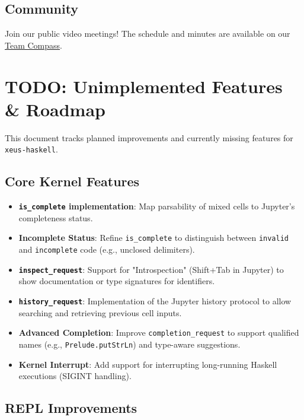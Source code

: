 \documentclass[11pt]{article}
\begin{document}
\subsection{Community}


Join our public video meetings! The schedule and minutes are available on our \href{https://jupyter-xeus.github.io/}{Team Compass}.

\section{TODO: Unimplemented Features \& Roadmap}
\label{sec:todo}


This document tracks planned improvements and currently missing features for \texttt{xeus-haskell}.
\subsection{Core Kernel Features}


\begin{itemize}
\item [x] \textbf{\texttt{is\_complete} implementation}: Map parsability of mixed cells to Jupyter's completeness status.
\item [ ] \textbf{Incomplete Status}: Refine \texttt{is\_complete} to distinguish between \texttt{invalid} and \texttt{incomplete} code (e.g., unclosed delimiters).
\item [x] \textbf{\texttt{inspect\_request}}: Support for "Introspection" (Shift+Tab in Jupyter) to show documentation or type signatures for identifiers.
\item [ ] \textbf{\texttt{history\_request}}: Implementation of the Jupyter history protocol to allow searching and retrieving previous cell inputs.
\item [ ] \textbf{Advanced Completion}: Improve \texttt{completion\_request} to support qualified names (e.g., \texttt{Prelude.putStrLn}) and type-aware suggestions.
\item [ ] \textbf{Kernel Interrupt}: Add support for interrupting long-running Haskell executions (SIGINT handling).
\end{itemize}


\subsection{REPL Improvements}
\end{document}
